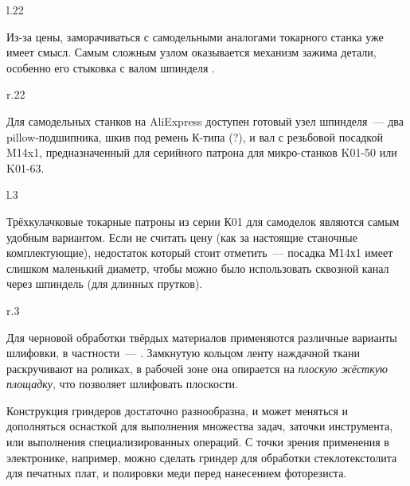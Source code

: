 \begin{wrapfigure}{l}{.22\textwidth}
\end{wrapfigure}

\noindent
Из-за цены, заморачиваться с самодельными аналогами токарного станка уже
имеет смысл. Самым сложным узлом оказывается механизм зажима
детали, особенно его стыковка с валом шпинделя .

\clearpage
\begin{wrapfigure}{r}{.22\textwidth}
    \vspace{-1.5cm}
\end{wrapfigure}

Для самодельных станков на AliExpress доступен готовый узел шпинделя\ --- два
pillow-подшипника, шкив под ремень К-типа (?), и вал с резьбовой посадкой M14x1,
предназначенный для серийного патрона для микро-станков K01-50 или K01-63.

\begin{wrapfigure}{l}{.3\textwidth}
\end{wrapfigure}

\vspace{1cm}
Трёхкулачковые токарные патроны из серии К01 для самоделок являются самым
удобным вариантом. Если не считать цену (как за настоящие станочные
комплектующие), недостаток который стоит отметить\ --- посадка М14х1 имеет
слишком маленький диаметр, чтобы можно было использовать сквозной канал через
шпиндель (для длинных прутков).

\clearpage
\begin{wrapfigure}{r}{.3\textwidth}
\end{wrapfigure}

Для черновой обработки твёрдых материалов применяются различные варианты
шлифовки, в частности\ --- . Замкнутую кольцом ленту
наждачной ткани раскручивают на роликах, в рабочей зоне она опирается на
\textit{плоскую жёсткую площадку}, что позволяет шлифовать плоскости.

Конструкция гриндеров достаточно разнообразна, и может меняться и дополняться
оснасткой для выполнения множества задач, заточки инструмента, или выполнения
специализированных операций. С точки зрения применения в электронике, например, можно
сделать гриндер для обработки стеклотекстолита для печатных плат, и полировки
меди перед нанесением фоторезиста.
